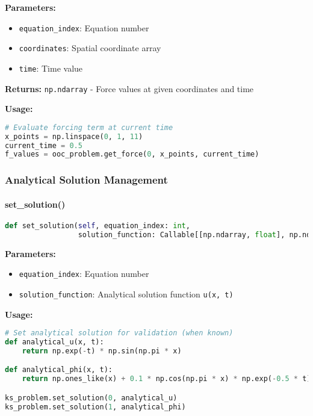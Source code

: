 \textbf{Parameters:}
\begin{itemize}
    \item \texttt{equation\_index}: Equation number
    \item \texttt{coordinates}: Spatial coordinate array
    \item \texttt{time}: Time value
\end{itemize}

\textbf{Returns:} \texttt{np.ndarray} - Force values at given coordinates and time

\textbf{Usage:}
\begin{lstlisting}[language=Python]
# Evaluate forcing term at current time
x_points = np.linspace(0, 1, 11)
current_time = 0.5
f_values = ooc_problem.get_force(0, x_points, current_time)
\end{lstlisting}

\subsubsection{Analytical Solution Management}

\paragraph{set\_solution()}
\begin{lstlisting}[language=Python, caption=Set Solution Method]
def set_solution(self, equation_index: int,
                 solution_function: Callable[[np.ndarray, float], np.ndarray])
\end{lstlisting}

\textbf{Parameters:}
\begin{itemize}
    \item \texttt{equation\_index}: Equation number
    \item \texttt{solution\_function}: Analytical solution function \texttt{u(x, t)}
\end{itemize}

\textbf{Usage:}
\begin{lstlisting}[language=Python, caption=Analytical Solution Example]
# Set analytical solution for validation (when known)
def analytical_u(x, t):
    return np.exp(-t) * np.sin(np.pi * x)

def analytical_phi(x, t):
    return np.ones_like(x) + 0.1 * np.cos(np.pi * x) * np.exp(-0.5 * t)

ks_problem.set_solution(0, analytical_u)
ks_problem.set_solution(1, analytical_phi)
\end{lstlisting}

